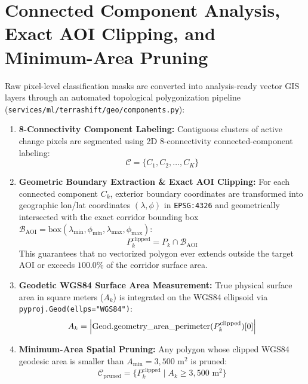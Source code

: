 \section{Connected Component Analysis, Exact AOI Clipping, and Minimum-Area Pruning}
\label{sec:ai_polygonization}
Raw pixel-level classification masks are converted into analysis-ready vector GIS layers through an automated topological polygonization pipeline (\texttt{services/ml/terrashift/geo/components.py}):

\begin{enumerate}
    \item \textbf{8-Connectivity Component Labeling:} Contiguous clusters of active change pixels are segmented using 2D 8-connectivity connected-component labeling:
    \begin{equation}
        \mathcal{C} = \{ C_1, C_2, \dots, C_K \}
        \label{eq:connected_components}
    \end{equation}
    \item \textbf{Geometric Boundary Extraction \& Exact AOI Clipping:} For each connected component $C_k$, exterior boundary coordinates are transformed into geographic lon/lat coordinates $(\lambda, \phi)$ in \texttt{EPSG:4326} and geometrically intersected with the exact corridor bounding box $\mathcal{B}_{\text{AOI}} = \text{box}(\lambda_{\min}, \phi_{\min}, \lambda_{\max}, \phi_{\max})$:
    \begin{equation}
        P_k^{\text{clipped}} = P_k \cap \mathcal{B}_{\text{AOI}}
        \label{eq:aoi_clipping}
    \end{equation}
    This guarantees that no vectorized polygon ever extends outside the target AOI or exceeds $100.0\%$ of the corridor surface area.
    \item \textbf{Geodetic WGS84 Surface Area Measurement:} True physical surface area in square meters ($A_k$) is integrated on the WGS84 ellipsoid via \texttt{pyproj.Geod(ellps="WGS84")}:
    \begin{equation}
        A_k = \left\lvert\text{Geod.geometry\_area\_perimeter}(P_k^{\text{clipped}})[0]\right\rvert
        \label{eq:geod_area}
    \end{equation}
    \item \textbf{Minimum-Area Spatial Pruning:} Any polygon whose clipped WGS84 geodesic area is smaller than $A_{\min} = 3{,}500\text{ m}^2$ is pruned:
    \begin{equation}
        \mathcal{C}_{\text{pruned}} = \{ P_k^{\text{clipped}} \mid A_k \ge 3{,}500\text{ m}^2 \}
        \label{eq:area_pruning}
    \end{equation}
\end{enumerate}
\newpage
